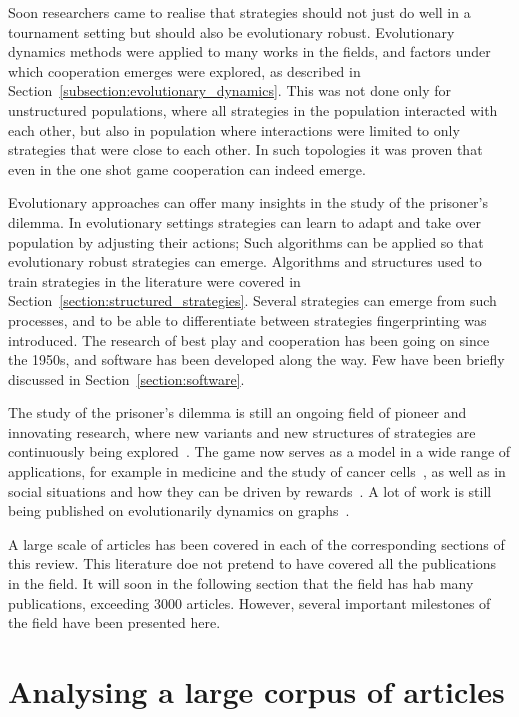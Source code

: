 \documentclass{article}
\theoremstyle{definition}
\begin{document}
Soon researchers came to realise that strategies should not just do well in a tournament setting
but should also be evolutionary robust. Evolutionary dynamics methods were
applied to many works in the fields, and factors under which cooperation
emerges were explored, as described in Section~\ref{subsection:evolutionary_dynamics}.
This was not done only for unstructured populations, where all strategies
in the population interacted with each other, but also in population where
interactions were limited to only strategies that were close to each other.
In such topologies it was proven that even in the one shot game cooperation can
indeed emerge.

Evolutionary approaches can offer many insights in the study of the prisoner's
dilemma. In evolutionary settings strategies can learn to adapt and take over
population by adjusting their actions;
Such algorithms can be applied so that evolutionary robust strategies can emerge.
Algorithms and structures used to train strategies in the literature were covered in
Section~\ref{section:structured_strategies}. Several strategies can emerge from
such processes, and to be able to differentiate between strategies fingerprinting
was introduced. The research of best play and cooperation has been going on
since the 1950s, and software has been developed along the way.
Few have been briefly discussed in Section~\ref{section:software}.

The study of the prisoner's dilemma is still an ongoing field of pioneer and
innovating research, where new variants and new structures of strategies are
continuously being explored~\cite{Ohtsuki2018}. The game now serves as a model
in a wide range of applications, for example in medicine and the study of cancer
cells~\cite{archetti2018, Kaznatchee2017}, as well as in social situations and
how they can be driven by rewards~\cite{Dridi2018}. A lot of work is still being
published on  evolutionarily dynamics on graphs~\cite{Allen2017, hathcock2018,
Liu2017}.

A large scale of articles has been covered in each of the corresponding sections
of this review. This literature doe not pretend to have covered all the publications
in the field. It will soon in the following section that the field has hab many
publications, exceeding 3000 articles. However, several important milestones
of the field have been presented here.


\section{Analysing a large corpus of articles}\label{section:analysis}

\newpage


\end{document}
